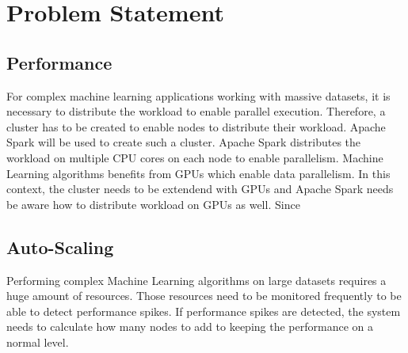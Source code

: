 \section{Problem Statement}
\subsection{Performance}
For complex machine learning applications working with massive datasets, it is necessary to distribute the workload to enable parallel execution. Therefore, a cluster has to be created to enable nodes to distribute their workload. Apache Spark will be used to create such a cluster.
Apache Spark distributes the workload on multiple CPU cores on each node to enable parallelism. Machine Learning algorithms benefits from GPUs which enable data parallelism. In this context, the cluster needs to be extendend with GPUs and Apache Spark needs be aware how to distribute workload on GPUs as well.
Since 


\subsection{Auto-Scaling}
Performing complex Machine Learning algorithms on large datasets requires a huge amount of resources. Those resources need to be monitored frequently to be able to detect performance spikes. If performance spikes are detected, the system needs to calculate how many nodes to add to keeping the performance on a normal level.








